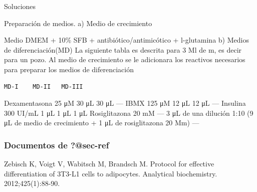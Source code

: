 \documentclass[
  spanish,
  12pt,
  a4paper,
]{article}
\begin{document}
Soluciones

Preparación de medios. a) Medio de crecimiento

Medio DMEM + 10\% SFB + antibiótico/antimicótico + l-glutamina b) Medios
de diferenciación(MD) La siguiente tabla es descrita para 3 Ml de m, es
decir para un pozo. Al medio de crecimiento se le adicionara los
reactivos necesarios para preparar los medios de diferenciación

\begin{verbatim}
MD-I    MD-II   MD-III
\end{verbatim}

Dexamentasona 25 μM 30 μL 30 μL --- IBMX 125 μM 12 μL 12 μL --- Insulina
300 UI/mL 1 μL 1 μL 1 μL Rosiglitazona 20 mM --- 3 μL de una dilución
1:10 (9 μL de medio de crecimiento + 1 μL de rosiglitazona 20 Mm) ---

\subsubsection{\texorpdfstring{Documentos de
\textbf{?@sec-ref}}{Documentos de ?@sec-ref}}\label{documentos-de--sec-ref}

Zebisch K, Voigt V, Wabitsch M, Brandsch M. Protocol for effective
differentiation of 3T3-L1 cells to adipocytes. Analytical biochemistry.
2012;425(1):88-90.


\printbibliography[title=References]
\end{document}

